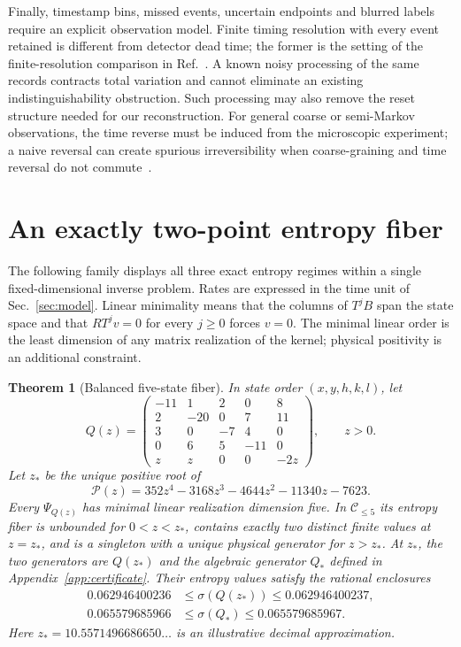 \documentclass[aps,pre,onecolumn,11pt,longbibliography,notitlepage]{revtex4-2}
\newtheorem{theorem}{Theorem}
\newcommand{\1}{\mathbf 1}
\newcommand{\C}{\mathcal C}
\newcommand{\sig}{\sigma}
\newcommand{\zs}{z_*}
\begin{document}
Finally, timestamp bins, missed events, uncertain endpoints and blurred
labels require an explicit observation model. Finite timing resolution
with every event retained is different from detector dead time; the
former is the setting of the finite-resolution comparison in
Ref.~\cite{FritzErtelSeifert2025}. A known noisy processing of the same
records contracts total variation and cannot eliminate an existing
indistinguishability obstruction. Such processing may also remove the
reset structure needed for our reconstruction. For general coarse or
semi-Markov observations, the time reverse must be induced from the
microscopic experiment; a naive reversal can create spurious
irreversibility when coarse-graining and time reversal do not
commute~\cite{Blom2024,BiskerReply2024}.

\section{An exactly two-point entropy fiber}\label{sec:balanced}
The following family displays all three exact entropy regimes within a single fixed-dimensional inverse problem. Rates are expressed in the time unit of Sec.~\ref{sec:model}. Linear minimality means that the columns of $T^jB$ span the state space and that $RT^jv=0$ for every $j\ge0$ forces $v=0$. The minimal linear order is the least dimension of any matrix realization of the kernel; physical positivity is an additional constraint.
\begin{theorem}[Balanced five-state fiber]\label{thm:balanced}
In state order $(x,y,h,k,l)$, let
\begin{equation}
 Q(z)=\begin{pmatrix}
 -11&1&2&0&8\\2&-20&0&7&11\\3&0&-7&4&0\\
 0&6&5&-11&0\\z&z&0&0&-2z
 \end{pmatrix},\qquad z>0.\label{eq:theta}
\end{equation}
Let $\zs$ be the unique positive root of
\begin{equation}
 \mathcal P(z)=352z^4-3168z^3-4644z^2-11340z-7623.\label{eq:quartic}
\end{equation}
Every $\Psi_{Q(z)}$ has minimal linear realization dimension five. In $\C_{\le5}$ its entropy fiber is unbounded for $0<z<\zs$, contains exactly two distinct finite values at $z=\zs$, and is a singleton with a unique physical generator for $z>\zs$. At $\zs$, the two generators are $Q(\zs)$ and the algebraic generator $Q_*$ defined in Appendix~\ref{app:certificate}. Their entropy values satisfy the rational enclosures
\begin{align}
 0.062946400236&\le\sig(Q(\zs))\le0.062946400237,\label{eq:sig1}\\
 0.065579685966&\le\sig(Q_*)\le0.065579685967.\label{eq:sig2}
\end{align}
Here $\zs=10.5571496686650\ldots$ is an illustrative decimal approximation.
\end{theorem}
\end{document}
